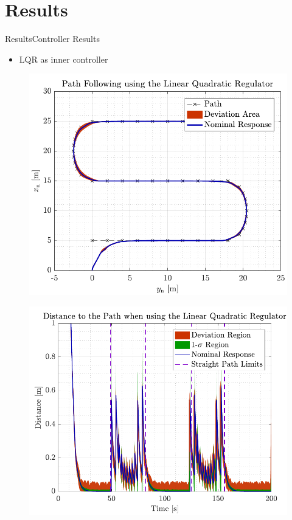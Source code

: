 \section{Results}

\begin{frame}{Results}{Controller Results}
\begin{itemize}
    \item LQR as inner controller
\end{itemize}
    \begin{minipage}{0.45\linewidth}
            \begin{figure}[H]
                \centering
                \includegraphics[width=1\linewidth]{figures/path_lqr}
            \end{figure}        
        \end{minipage}\hfill      
    \begin{minipage}{0.45\linewidth}
            \begin{figure}[H]
                \centering
                \includegraphics[width=1\linewidth]{figures/dist_lqr}

\end{figure}
\end{minipage}
\end{frame}
